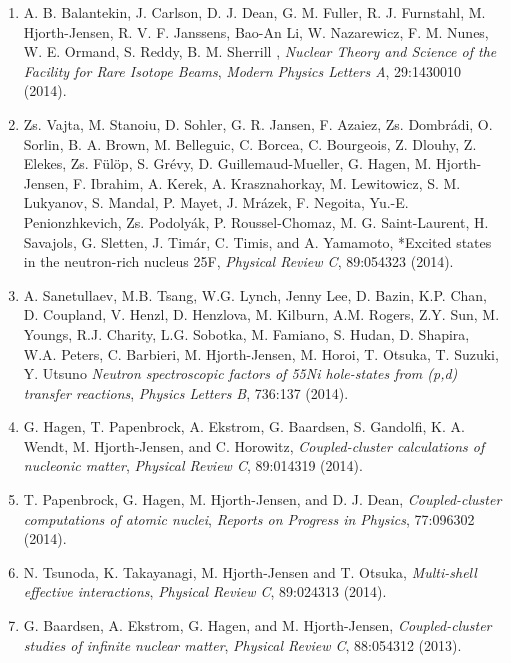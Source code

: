 \documentclass[%
oneside,                 %
final,                   %
10pt]{article}
\begin{document}
\begin{enumerate}
\item A. B. Balantekin, J. Carlson, D. J. Dean, G. M. Fuller, R. J. Furnstahl, M. Hjorth-Jensen, R. V. F. Janssens, Bao-An Li, W. Nazarewicz, F. M. Nunes, W. E. Ormand, S. Reddy, B. M. Sherrill ,  \emph{Nuclear Theory and Science of the Facility for Rare Isotope Beams},   \emph{Modern Physics Letters A}, 29:1430010 (2014).

\item Zs. Vajta, M. Stanoiu, D. Sohler, G. R. Jansen, F. Azaiez, Zs. Dombrádi, O. Sorlin, B. A. Brown, M. Belleguic, C. Borcea, C. Bourgeois, Z. Dlouhy, Z. Elekes, Zs. Fülöp, S. Grévy, D. Guillemaud-Mueller, G. Hagen, M. Hjorth-Jensen, F. Ibrahim, A. Kerek, A. Krasznahorkay, M. Lewitowicz, S. M. Lukyanov, S. Mandal, P. Mayet, J. Mrázek, F. Negoita, Yu.-E. Penionzhkevich, Zs. Podolyák, P. Roussel-Chomaz, M. G. Saint-Laurent, H. Savajols, G. Sletten, J. Timár, C. Timis, and A. Yamamoto,   *Excited states in the neutron-rich nucleus 25F,   \emph{Physical Review C}, 89:054323 (2014).

\item A. Sanetullaev, M.B. Tsang, W.G. Lynch, Jenny Lee, D. Bazin, K.P. Chan, D. Coupland, V. Henzl, D. Henzlova, M. Kilburn, A.M. Rogers, Z.Y. Sun, M. Youngs, R.J. Charity, L.G. Sobotka, M. Famiano, S. Hudan, D. Shapira, W.A. Peters, C. Barbieri, M. Hjorth-Jensen, M. Horoi, T. Otsuka, T. Suzuki, Y. Utsuno  \emph{Neutron spectroscopic factors of 55Ni hole-states from (p,d) transfer reactions},   \emph{Physics Letters B}, 736:137 (2014).

\item G. Hagen, T. Papenbrock,   A. Ekstrom, G. Baardsen, S. Gandolfi, K. A. Wendt, M. Hjorth-Jensen, and C. Horowitz,  \emph{Coupled-cluster calculations of nucleonic matter},   \emph{Physical Review C},  89:014319 (2014).

\item T. Papenbrock, G. Hagen, M. Hjorth-Jensen, and  D. J. Dean,   \emph{Coupled-cluster computations of atomic nuclei},   \emph{Reports on Progress in Physics}, 77:096302 (2014).

\item N. Tsunoda, K. Takayanagi, M. Hjorth-Jensen and T. Otsuka,  \emph{Multi-shell effective interactions},   \emph{Physical Review C},    89:024313 (2014).

\item G. Baardsen, A. Ekstrom, G. Hagen, and M. Hjorth-Jensen,  \emph{Coupled-cluster studies of infinite  nuclear matter},   \emph{Physical Review C}, 88:054312 (2013).  


\end{enumerate}
\end{document}
